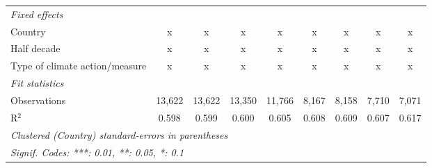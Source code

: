 \begin{tabular}{lcccccccc}
   \emph{Fixed effects}\\
   Country                                                    & x              & x              & x              & x             & x              & x              & x              & x\\  
   Half decade                                                & x              & x              & x              & x             & x              & x              & x              & x\\  
   Type of climate action/measure                             & x              & x              & x              & x             & x              & x              & x              & x\\  
   \midrule \emph{Fit statistics}\\
   Observations                                               & 13,622         & 13,622         & 13,350         & 11,766        & 8,167          & 8,158          & 7,710          & 7,071\\  
   R$^2$                                                      & 0.598          & 0.599          & 0.600          & 0.605         & 0.608          & 0.609          & 0.607          & 0.617\\  
   \midrule
   \multicolumn{9}{l}{\emph{Clustered (Country) standard-errors in parentheses}}\\
   \multicolumn{9}{l}{\emph{Signif. Codes: ***: 0.01, **: 0.05, *: 0.1}}\\
\end{tabular}
\par\endgroup


